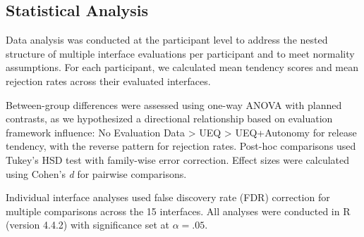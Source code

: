 \subsection{Statistical Analysis}

Data analysis was conducted at the participant level to address the nested structure of multiple interface evaluations per participant and to meet normality assumptions. For each participant, we calculated mean tendency scores and mean rejection rates across their evaluated interfaces. 

Between-group differences were assessed using one-way ANOVA with planned contrasts, as we hypothesized a directional relationship based on evaluation framework influence: No Evaluation Data > UEQ > UEQ+Autonomy for release tendency, with the reverse pattern for rejection rates. Post-hoc comparisons used Tukey's HSD test with family-wise error correction. Effect sizes were calculated using Cohen's \textit{d} for pairwise comparisons.

Individual interface analyses used false discovery rate (FDR) correction for multiple comparisons across the 15 interfaces. All analyses were conducted in R (version 4.4.2) with significance set at $\alpha = .05$.
